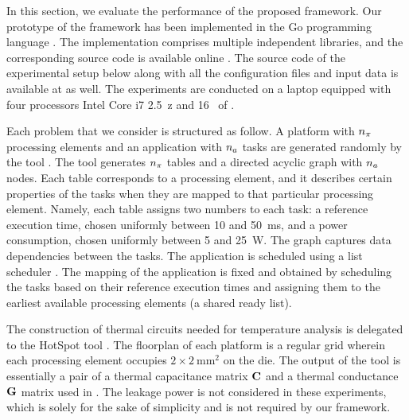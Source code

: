 In this section, we evaluate the performance of the proposed framework. Our
prototype of the framework has been implemented in the Go programming language
\cite{go}. The implementation comprises multiple independent libraries, and the
corresponding source code is available online \cite{sources}. The source code of
the experimental setup below along with all the configuration files and input
data is available at \cite{sources} as well. The experiments are conducted on a
laptop equipped with four processors Intel Core i7 2.5~z and
16~ of .

Each problem that we consider is structured as follow. A platform with ${n_\pi}$
processing elements and an application with ${n_a}$ tasks are generated randomly
by the  tool \cite{dick1998}. The tool generates ${n_\pi}$ tables and a
directed acyclic graph with ${n_a}$ nodes. Each table corresponds to a processing
element, and it describes certain properties of the tasks when they are mapped
to that particular processing element. Namely, each table assigns two numbers to
each task: a reference execution time, chosen uniformly between 10 and 50~ms,
and a power consumption, chosen uniformly between 5 and 25~W. The graph captures
data dependencies between the tasks. The application is scheduled using a list
scheduler \cite{adam1974}. The mapping of the application is fixed and obtained
by scheduling the tasks based on their reference execution times and assigning
them to the earliest available processing elements (a shared ready list).

The construction of thermal  circuits needed for temperature analysis
is delegated to the HotSpot tool \cite{skadron2004}. The floorplan of each
platform is a regular grid wherein each processing element occupies $2 \times
2~\text{mm}^2$ on the die. The output of the tool is essentially a pair of a
thermal capacitance matrix $\mathbf{C}$ and a thermal conductance $\mathbf{G}$ matrix used in
. The leakage power is not considered in these experiments,
which is solely for the sake of simplicity and is not required by our framework.

